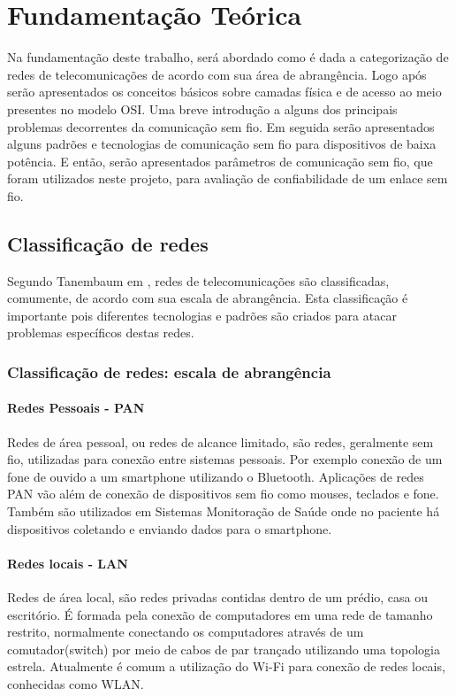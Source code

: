\chapter{Fundamentação Teórica}
\label{fundamentacao}
Na fundamentação deste trabalho, será abordado como é dada a categorização de redes de telecomunicações de acordo com sua área de abrangência. Logo após serão apresentados os conceitos básicos sobre camadas física e de acesso ao meio presentes no modelo OSI. Uma breve introdução a alguns dos principais problemas decorrentes da comunicação sem fio. Em seguida serão apresentados alguns padrões e tecnologias de comunicação sem fio para dispositivos de baixa potência. E então, serão apresentados parâmetros de comunicação sem fio, que foram utilizados neste projeto, para avaliação de confiabilidade de um enlace sem fio.

\section{Classificação de redes}
\label{classRedes}
Segundo Tanembaum em \cite{tanembaum2011}, redes de telecomunicações são classificadas, comumente, de acordo com sua escala de abrangência. Esta classificação é importante pois diferentes tecnologias e padrões são criados para atacar problemas específicos destas redes.
\subsection{Classificação de redes: escala de abrangência}


\subsubsection*{Redes Pessoais - PAN}
Redes de área pessoal, ou redes de alcance limitado, são redes, geralmente sem fio, utilizadas para conexão entre sistemas pessoais. Por exemplo conexão de um fone de ouvido a um smartphone utilizando o Bluetooth. Aplicações de redes PAN vão além de conexão de dispositivos sem fio como mouses, teclados e fone. Também são utilizados em Sistemas Monitoração de Saúde onde no paciente há dispositivos coletando e enviando dados para o smartphone.

\subsubsection*{Redes locais - LAN}
Redes de área local, são redes privadas contidas dentro de um prédio, casa ou escritório. É formada pela conexão de computadores em uma rede de tamanho restrito, normalmente conectando os computadores através de um comutador(switch) por meio de cabos de par trançado utilizando uma topologia estrela. Atualmente é comum a utilização do Wi-Fi para conexão de redes locais, conhecidas como WLAN.

